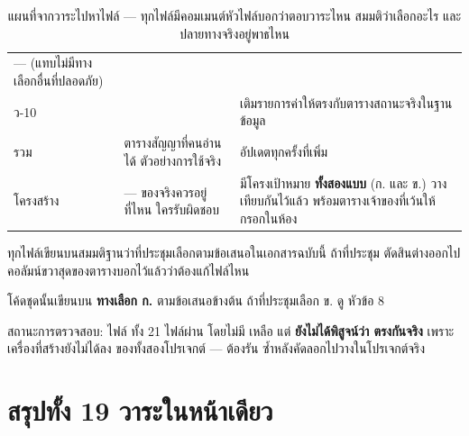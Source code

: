 \begin{table}[H]
\begin{tabular}{L{1.1cm}L{6.6cm}L{6.9cm}}
--- (แทบไม่มีทางเลือกอื่นที่ปลอดภัย) \\
\addlinespace
ว-10 &  &
เติมรายการค่าให้ตรงกับตารางสถานะจริงในฐานข้อมูล \\
\addlinespace
รวม &  ตารางสัญญาที่คนอ่านได้\newline{} ตัวอย่างการใช้จริง &
อัปเดตทุกครั้งที่เพิ่ม  \\
\addlinespace
โครงสร้าง &  --- ของจริงควรอยู่ที่ไหน ใครรับผิดชอบ &
มีโครงเป้าหมาย \textbf{ทั้งสองแบบ} (ก. และ ข.) วางเทียบกันไว้แล้ว
พร้อมตารางเจ้าของที่เว้นให้กรอกในห้อง \\
\bottomrule
\end{tabular}
\caption{แผนที่จากวาระไปหาไฟล์ --- ทุกไฟล์มีคอมเมนต์หัวไฟล์บอกว่าตอบวาระไหน สมมติว่าเลือกอะไร และปลายทางจริงอยู่พาธไหน}
\end{table}

\begin{warnbox}[title={โค้ดชุดนั้นเขียนบน \emph{ข้อเสนอ} ยังไม่ใช่มติ}]
ทุกไฟล์เขียนบนสมมติฐานว่าที่ประชุมเลือกตามข้อเสนอในเอกสารฉบับนี้ ถ้าที่ประชุม
ตัดสินต่างออกไป คอลัมน์ขวาสุดของตารางบอกไว้แล้วว่าต้องแก้ไฟล์ไหน

โค้ดชุดนั้นเขียนบน \textbf{ทางเลือก ก.} ตามข้อเสนอข้างต้น ถ้าที่ประชุมเลือก ข.
ดู  หัวข้อ 8

สถานะการตรวจสอบ: ไฟล์  ทั้ง 21 ไฟล์ผ่าน  โดยไม่มี
 เหลือ แต่ \textbf{ยังไม่ได้พิสูจน์ว่า  ตรงกันจริง}
เพราะเครื่องที่สร้างยังไม่ได้ลง  ของทั้งสองโปรเจกต์ ---
ต้องรัน  ซ้ำหลังคัดลอกไปวางในโปรเจกต์จริง
\end{warnbox}

\clearpage

\section{สรุปทั้ง 19 วาระในหน้าเดียว}

